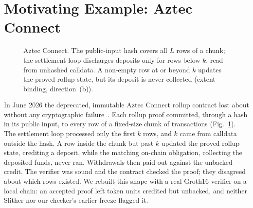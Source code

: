 \section{Motivating Example: Aztec Connect}\label{sec:motivating}

\begin{figure}[t]
\centering

\caption{Aztec Connect. The public-input hash covers all $L$ rows of a chunk;
the settlement loop discharges deposits only for rows below $k$, read from
unhashed calldata. A non-empty row at or beyond $k$ updates the proved rollup
state, but its deposit is never collected (extent binding, direction~(b)).}
\label{fig:aztec}
\end{figure}

In June 2026 the deprecated, immutable Aztec Connect rollup contract lost
about \usdM{\AztecLossUSD} without any cryptographic
failure~\cite{aztec-incident,aztec-blocksec,aztec-rekt}. Each rollup proof
committed, through a hash in its public input, to every row of a fixed-size
chunk of transactions (Fig.~\ref{fig:aztec}). The settlement loop processed
only the first $k$ rows, and $k$ came from calldata outside the hash. A row
inside the chunk but past $k$ updated the proved rollup state, crediting a
deposit, while the matching on-chain obligation, collecting the deposited
funds, never ran. Withdrawals then paid out against the unbacked credit. The
verifier was sound and the contract checked the proof; they disagreed about
which rows existed. We rebuilt this shape with a real Groth16 verifier on a
local chain: an accepted proof left \AztecTestbedUnbackedGap{} token units
credited but unbacked, and neither Slither nor our checker's earlier freeze
flagged it.%
